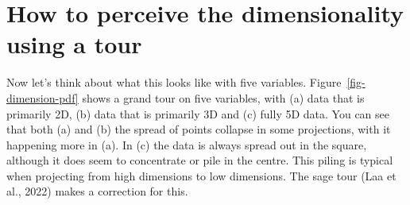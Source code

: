\documentclass[
  letterpaper,
]{krantz}
\begin{document}
\section{How to perceive the dimensionality using a
tour}\label{how-to-perceive-the-dimensionality-using-a-tour}

Now let's think about what this looks like with five variables.
Figure~\ref{fig-dimension-pdf} shows a grand tour on five variables,
with (a) data that is primarily 2D, (b) data that is primarily 3D and
(c) fully 5D data. You can see that both (a) and (b) the spread of
points collapse in some projections, with it happening more in (a). In
(c) the data is always spread out in the square, although it does seem
to concentrate or pile in the centre. This piling is typical when
projecting from high dimensions to low dimensions. The sage tour (Laa et
al., 2022) makes a correction for this.
\end{document}
